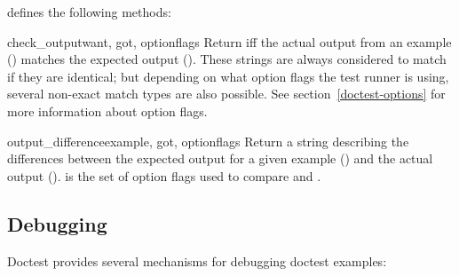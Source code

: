  defines the following methods:

\begin{methoddesc}{check_output}{want, got, optionflags}
    Return  iff the actual output from an example
    () matches the expected output ().  These
    strings are always considered to match if they are identical; but
    depending on what option flags the test runner is using, several
    non-exact match types are also possible.  See
    section~\ref{doctest-options} for more information about option
    flags.
\end{methoddesc}

\begin{methoddesc}{output_difference}{example, got, optionflags}
    Return a string describing the differences between the expected
    output for a given example () and the actual output
    ().   is the set of option flags used to
    compare  and .
\end{methoddesc}

\subsection{Debugging\label{doctest-debugging}}

Doctest provides several mechanisms for debugging doctest examples:


